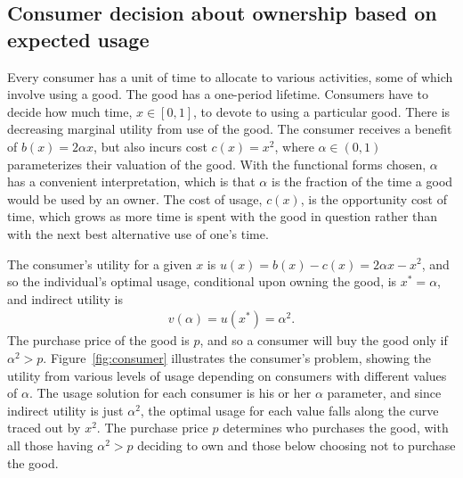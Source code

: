 \documentclass[11pt]{article}
\begin{document}
\subsection{Consumer decision about ownership based on expected usage}  
Every consumer has a unit of time to allocate to various activities, some of which involve using a good.  
The good has a one-period lifetime. 
Consumers have to decide how much time, $x \in [0,1]$, to devote to using a particular good. 
There is decreasing marginal utility from use of the good.
The consumer receives a benefit of $b(x) = 2\alpha x$, but also incurs cost $c(x) = x^2$,  
where $\alpha \in (0,1)$ parameterizes their valuation of the good.
With the functional forms chosen, $\alpha$ has a convenient interpretation, which is that $\alpha$ is the fraction of the time a good would be used by an owner. 
The cost of usage, $c(x)$, is the opportunity cost of time, which grows as more time is spent with the good in question rather than with the next best alternative use of one's time.

The consumer's utility for a given $x$ is $u(x) = b(x) - c(x) = 2 \alpha x - x^2$, and so the individual's optimal usage, conditional upon owning the good, is $x^* = \alpha$, and indirect utility is 
\begin{align}
v(\alpha) = u(x^*) = \alpha^2.  
\end{align} 
The purchase price of the good is $p$, and so a consumer will buy the good only if $\alpha^2 > p$. 
Figure~\ref{fig:consumer} illustrates the consumer's problem, showing the utility from various levels of usage depending on consumers with different values of $\alpha$.
The usage solution for each consumer is his or her $\alpha$ parameter, and since indirect utility is just $\alpha^2$, the optimal usage for each value falls along the curve traced out by $x^2$.
The purchase price $p$ determines who purchases the good, with all those having $\alpha^2 > p$ deciding to own and those below choosing not to purchase the good. 

\pgfmathsetmacro{\xstarOne}{\alphaOne}%
%

\pgfmathsetmacro{\xstarTwo}{\alphaTwo}%
%

\pgfmathsetmacro{\xstarThree}{\alphaThree}%
%
\end{document}
